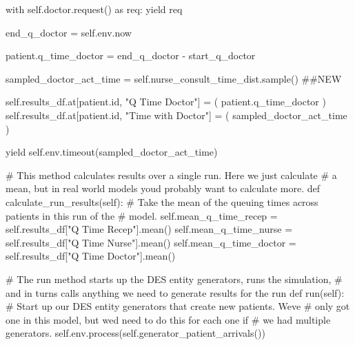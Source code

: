 \documentclass[
  letterpaper,
  DIV=11,
  numbers=noendperiod]{scrreprt}
\newenvironment{Shaded}{\begin{snugshade}}{\end{snugshade}}
\newcommand{\BuiltInTok}[1]{\textcolor[rgb]{0.00,0.23,0.31}{#1}}
\newcommand{\CommentTok}[1]{\textcolor[rgb]{0.37,0.37,0.37}{#1}}
\newcommand{\ControlFlowTok}[1]{\textcolor[rgb]{0.00,0.23,0.31}{#1}}
\newcommand{\ImportTok}[1]{\textcolor[rgb]{0.00,0.46,0.62}{#1}}
\newcommand{\KeywordTok}[1]{\textcolor[rgb]{0.00,0.23,0.31}{#1}}
\newcommand{\NormalTok}[1]{\textcolor[rgb]{0.00,0.23,0.31}{#1}}
\newcommand{\OperatorTok}[1]{\textcolor[rgb]{0.37,0.37,0.37}{#1}}
\newcommand{\StringTok}[1]{\textcolor[rgb]{0.13,0.47,0.30}{#1}}
\newcommand{\VariableTok}[1]{\textcolor[rgb]{0.07,0.07,0.07}{#1}}
\begin{document}
\begin{tcolorbox}
\begin{Shaded}
\begin{Highlighting}[]
            \ControlFlowTok{with} \VariableTok{self}\NormalTok{.doctor.request() }\ImportTok{as}\NormalTok{ req:}
                \ControlFlowTok{yield}\NormalTok{ req}

\NormalTok{                end\_q\_doctor }\OperatorTok{=} \VariableTok{self}\NormalTok{.env.now}

\NormalTok{                patient.q\_time\_doctor }\OperatorTok{=}\NormalTok{ end\_q\_doctor }\OperatorTok{{-}}\NormalTok{ start\_q\_doctor}

\NormalTok{                sampled\_doctor\_act\_time }\OperatorTok{=} \VariableTok{self}\NormalTok{.nurse\_consult\_time\_dist.sample() }\CommentTok{\#\#NEW}

                \VariableTok{self}\NormalTok{.results\_df.at[patient.}\BuiltInTok{id}\NormalTok{, }\StringTok{"Q Time Doctor"}\NormalTok{] }\OperatorTok{=}\NormalTok{ (}
\NormalTok{                    patient.q\_time\_doctor}
\NormalTok{                )}
                \VariableTok{self}\NormalTok{.results\_df.at[patient.}\BuiltInTok{id}\NormalTok{, }\StringTok{"Time with Doctor"}\NormalTok{] }\OperatorTok{=}\NormalTok{ (}
\NormalTok{                    sampled\_doctor\_act\_time}
\NormalTok{                )}

                \ControlFlowTok{yield} \VariableTok{self}\NormalTok{.env.timeout(sampled\_doctor\_act\_time)}

    \CommentTok{\# This method calculates results over a single run.  Here we just calculate}
    \CommentTok{\# a mean, but in real world models you\textquotesingle{}d probably want to calculate more.}
    \KeywordTok{def}\NormalTok{ calculate\_run\_results(}\VariableTok{self}\NormalTok{):}
        \CommentTok{\# Take the mean of the queuing times across patients in this run of the}
        \CommentTok{\# model.}
        \VariableTok{self}\NormalTok{.mean\_q\_time\_recep }\OperatorTok{=} \VariableTok{self}\NormalTok{.results\_df[}\StringTok{"Q Time Recep"}\NormalTok{].mean()}
        \VariableTok{self}\NormalTok{.mean\_q\_time\_nurse }\OperatorTok{=} \VariableTok{self}\NormalTok{.results\_df[}\StringTok{"Q Time Nurse"}\NormalTok{].mean()}
        \VariableTok{self}\NormalTok{.mean\_q\_time\_doctor }\OperatorTok{=} \VariableTok{self}\NormalTok{.results\_df[}\StringTok{"Q Time Doctor"}\NormalTok{].mean()}

    \CommentTok{\# The run method starts up the DES entity generators, runs the simulation,}
    \CommentTok{\# and in turns calls anything we need to generate results for the run}
    \KeywordTok{def}\NormalTok{ run(}\VariableTok{self}\NormalTok{):}
        \CommentTok{\# Start up our DES entity generators that create new patients.  We\textquotesingle{}ve}
        \CommentTok{\# only got one in this model, but we\textquotesingle{}d need to do this for each one if}
        \CommentTok{\# we had multiple generators.}
        \VariableTok{self}\NormalTok{.env.process(}\VariableTok{self}\NormalTok{.generator\_patient\_arrivals())}


\end{Highlighting}
\end{Shaded}
\end{tcolorbox}
\end{document}
